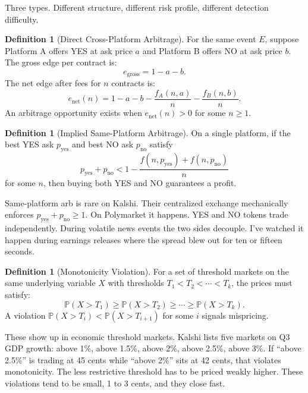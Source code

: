 \documentclass[11pt]{article}
\theoremstyle{definition}
\newtheorem{definition}[theorem]{Definition}
\theoremstyle{remark}
\newcommand{\Prob}{\mathbb{P}}
\begin{document}
Three types. Different structure, different risk profile, different detection difficulty.

\begin{definition}[Direct Cross-Platform Arbitrage]
\label{def:cross-arb}
For the same event $E$, suppose Platform A offers YES at ask price $a$ and Platform B offers NO at ask price $b$. The gross edge per contract is:
\begin{equation}
\label{eq:cross-edge}
e_{\text{gross}} = 1 - a - b.
\end{equation}
The net edge after fees for $n$ contracts is:
\begin{equation}
\label{eq:net-edge}
e_{\text{net}}(n) = 1 - a - b - \frac{f_A(n, a)}{n} - \frac{f_B(n, b)}{n}.
\end{equation}
An arbitrage opportunity exists when $e_{\text{net}}(n) > 0$ for some $n \geq 1$.
\end{definition}

\begin{definition}[Implied Same-Platform Arbitrage]
\label{def:same-arb}
On a single platform, if the best YES ask $p_{\text{yes}}$ and best NO ask $p_{\text{no}}$ satisfy
\begin{equation}
p_{\text{yes}} + p_{\text{no}} < 1 - \frac{f(n, p_{\text{yes}}) + f(n, p_{\text{no}})}{n}
\end{equation}
for some $n$, then buying both YES and NO guarantees a profit.
\end{definition}

Same-platform arb is rare on Kalshi. Their centralized exchange mechanically enforces $p_{\text{yes}} + p_{\text{no}} \geq 1$. On Polymarket it happens. YES and NO tokens trade independently. During volatile news events the two sides decouple. I've watched it happen during earnings releases where the spread blew out for ten or fifteen seconds.

\begin{definition}[Monotonicity Violation]
\label{def:mono}
For a set of threshold markets on the same underlying variable $X$ with thresholds $T_1 < T_2 < \cdots < T_k$, the prices must satisfy:
\begin{equation}
\Prob(X > T_1) \geq \Prob(X > T_2) \geq \cdots \geq \Prob(X > T_k).
\end{equation}
A violation $\Prob(X > T_i) < \Prob(X > T_{i+1})$ for some $i$ signals mispricing.
\end{definition}

These show up in economic threshold markets. Kalshi lists five markets on Q3 GDP growth: above 1\%, above 1.5\%, above 2\%, above 2.5\%, above 3\%. If ``above 2.5\%'' is trading at 45 cents while ``above 2\%'' sits at 42 cents, that violates monotonicity. The less restrictive threshold has to be priced weakly higher. These violations tend to be small, 1 to 3 cents, and they close fast.
\end{document}
